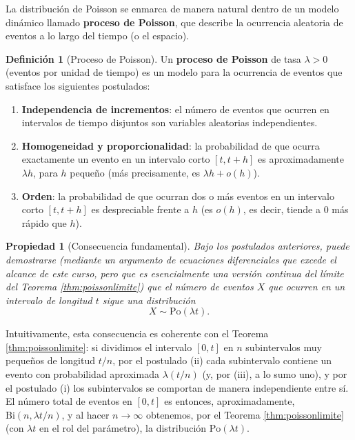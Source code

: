 \documentclass[11pt,a4paper]{article}
\theoremstyle{plain}
\newtheorem{propiedad}[teorema]{Propiedad}
\theoremstyle{definition}
\newtheorem{definicion}[teorema]{Definición}
\theoremstyle{remark}
\begin{document}
La distribución de Poisson se enmarca de manera natural dentro de un modelo dinámico llamado \textbf{proceso de Poisson}, que describe la ocurrencia aleatoria de eventos a lo largo del tiempo (o el espacio).

\begin{definicion}[Proceso de Poisson]
Un \textbf{proceso de Poisson} de tasa $\lambda>0$ (eventos por unidad de tiempo) es un modelo para la ocurrencia de eventos que satisface los siguientes postulados:
\begin{enumerate}[label=(\roman*)]
\item \textbf{Independencia de incrementos}: el número de eventos que ocurren en intervalos de tiempo disjuntos son variables aleatorias independientes.
\item \textbf{Homogeneidad y proporcionalidad}: la probabilidad de que ocurra exactamente un evento en un intervalo corto $[t,t+h]$ es aproximadamente $\lambda h$, para $h$ pequeño (más precisamente, es $\lambda h+o(h)$).
\item \textbf{Orden}: la probabilidad de que ocurran dos o más eventos en un intervalo corto $[t,t+h]$ es despreciable frente a $h$ (es $o(h)$, es decir, tiende a $0$ más rápido que $h$).
\end{enumerate}
\end{definicion}

\begin{propiedad}[Consecuencia fundamental]
Bajo los postulados anteriores, puede demostrarse (mediante un argumento de ecuaciones diferenciales que excede el alcance de este curso, pero que es esencialmente una versión continua del límite del Teorema \ref{thm:poissonlimite}) que el número de eventos $X$ que ocurren en un intervalo de longitud $t$ sigue una distribución
$$X\sim\text{Po}(\lambda t).$$
\end{propiedad}

Intuitivamente, esta consecuencia es coherente con el Teorema \ref{thm:poissonlimite}: si dividimos el intervalo $[0,t]$ en $n$ subintervalos muy pequeños de longitud $t/n$, por el postulado (ii) cada subintervalo contiene un evento con probabilidad aproximada $\lambda(t/n)$ (y, por (iii), a lo sumo uno), y por el postulado (i) los subintervalos se comportan de manera independiente entre sí. El número total de eventos en $[0,t]$ es entonces, aproximadamente, $\text{Bi}(n,\lambda t/n)$, y al hacer $n\to\infty$ obtenemos, por el Teorema \ref{thm:poissonlimite} (con $\lambda t$ en el rol del parámetro), la distribución $\text{Po}(\lambda t)$.
\end{document}
